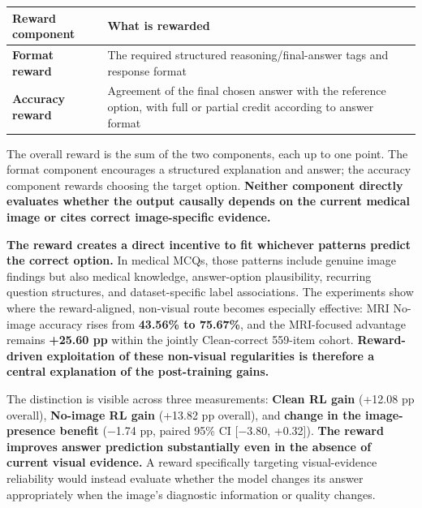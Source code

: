 \documentclass[
  10pt,
  a4paper,
]{article}
\newcounter{none} %
\begin{document}
{\def\LTcaptype{none} %
\begin{longtable}[]{@{}
  >{\raggedright\arraybackslash}p{}
  >{\raggedright\arraybackslash}p{}@{}}
\toprule\noalign{}
\begin{minipage}[b]{\linewidth}\raggedright
Reward component
\end{minipage} & \begin{minipage}[b]{\linewidth}\raggedright
What is rewarded
\end{minipage} \\
\midrule\noalign{}
\endhead
\bottomrule\noalign{}
\endlastfoot
\textbf{Format reward} & The required structured reasoning/final-answer
tags and response format \\
\textbf{Accuracy reward} & Agreement of the final chosen answer with the
reference option, with full or partial credit according to answer
format \\
\end{longtable}
}

The overall reward is the sum of the two components, each up to one
point. The format component encourages a structured explanation and
answer; the accuracy component rewards choosing the target option.
\textbf{Neither component directly evaluates whether the output causally
depends on the current medical image or cites correct image-specific
evidence.}

\textbf{The reward creates a direct incentive to fit whichever patterns
predict the correct option.} In medical MCQs, those patterns include
genuine image findings but also medical knowledge, answer-option
plausibility, recurring question structures, and dataset-specific label
associations. The experiments show where the reward-aligned, non-visual
route becomes especially effective: MRI No-image accuracy rises from
\textbf{43.56\% to 75.67\%}, and the MRI-focused advantage remains
\textbf{+25.60 pp} within the jointly Clean-correct 559-item cohort.
\textbf{Reward-driven exploitation of these non-visual regularities is
therefore a central explanation of the post-training gains.}

The distinction is visible across three measurements: \textbf{Clean RL
gain} (+12.08 pp overall), \textbf{No-image RL gain} (+13.82 pp
overall), and \textbf{change in the image-presence benefit} (−1.74 pp,
paired 95\% CI {[}−3.80, +0.32{]}). \textbf{The reward improves answer
prediction substantially even in the absence of current visual
evidence.} A reward specifically targeting visual-evidence reliability
would instead evaluate whether the model changes its answer
appropriately when the image's diagnostic information or quality
changes.
\end{document}
